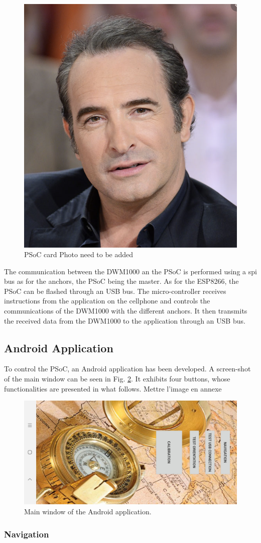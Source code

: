 \begin{figure}[H]
	\centering
	\includegraphics[width=.2\linewidth]{Images/Temporary_pic.png}
	\caption{PSoC card \color{red} Photo need to be added \color{black}}
	\label{fig:psoc}
\end{figure}

The communication between the DWM1000 an the PSoC is performed using a \gls{spi} bus as for the anchors, the PSoC being the master. As for the ESP8266, the PSoC can be flashed through an USB bus. The micro-controller receives instructions from the application on the cellphone and controls the communications of the DWM1000 with the different anchors. It then transmits the received data from the DWM1000 to the application through an USB bus.

\subsection{Android Application}

To control the PSoC, an Android application has been developed. A screen-shot of the main window can be seen in Fig. \ref{fig:android_app}. It exhibits four buttons, whose functionalities are presented in what follows.
\color{red} Mettre l'image en annexe \color{black}

\begin{figure}[H]
	\centering
	\includegraphics[width=.8\linewidth]{Images/app_main.jpg}
	\caption{Main window of the Android application.}
	\label{fig:android_app}
\end{figure}

\subsubsection{Navigation}

